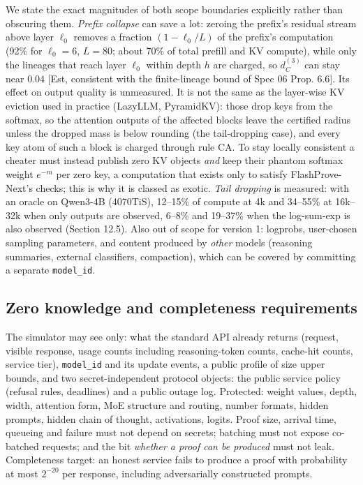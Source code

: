 \documentclass[10pt]{article}
\begin{document}
We state the exact magnitudes of both scope boundaries explicitly rather than obscuring them. \emph{Prefix collapse} can save a lot: zeroing the prefix's residual stream above layer $\ell_0$ removes a fraction $(1-\ell_0/L)$ of the prefix's computation (92\% for $\ell_0=6$, $L=80$; about 70\% of total prefill and KV compute), while only the lineages that reach layer $\ell_0$ within depth $h$ are charged, so $d^{(3)}_C$ can stay near $0.04$ [Est, consistent with the finite-lineage bound of Spec 06 Prop. 6.6]. Its effect on output quality is unmeasured. It is not the same as the layer-wise KV eviction used in practice (LazyLLM, PyramidKV): those drop keys from the softmax, so the attention outputs of the affected blocks leave the certified radius unless the dropped mass is below rounding (the tail-dropping case), and every key atom of such a block is charged through rule CA. To stay locally consistent a cheater must instead publish zero KV objects \emph{and} keep their phantom softmax weight $e^{-m}$ per zero key, a computation that exists only to satisfy FlashProve-Next's checks; this is why it is classed as exotic. \emph{Tail dropping} is measured: with an oracle on Qwen3-4B (4070TiS), 12--15\% of compute at 4k and 34--55\% at 16k--32k when only outputs are observed, 6--8\% and 19--37\% when the log-sum-exp is also observed (Section 12.5). Also out of scope for version 1: logprobs, user-chosen sampling parameters, and content produced by \emph{other} models (reasoning summaries, external classifiers, compaction), which can be covered by committing a separate \texttt{model\_\allowbreak{}id}.

\subsection{Zero knowledge and completeness requirements}
The simulator may see only: what the standard API already returns (request, visible response, usage counts including reasoning-token counts, cache-hit counts, service tier), \texttt{model\_\allowbreak{}id} and its update events, a public profile of size upper bounds, and two secret-independent protocol objects: the public service policy (refusal rules, deadlines) and a public outage log. Protected: weight values, depth, width, attention form, MoE structure and routing, number formats, hidden prompts, hidden chain of thought, activations, logits. Proof size, arrival time, queueing and failure must not depend on secrets; batching must not expose co-batched requests; and the bit \emph{whether a proof can be produced} must not leak. Completeness target: an honest service fails to produce a proof with probability at most $2^{-20}$ per response, including adversarially constructed prompts.
\end{document}
